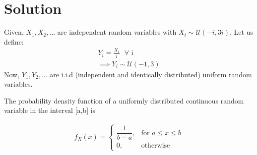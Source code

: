 \documentclass[journal,12pt,twocolumn]{IEEEtran}
\begin{document}
\section*{Solution}
Given, $X_1,X_2,\dots$ are independent random variables with $X_i\sim \mathcal U(-i,3i)$. Let us define:
\begin{align}
    Y_i = \frac{X_i}{i}\text{ }\forall\text{ i} \\
    \implies Y_i \sim \mathcal U(-1,3)
\end{align}
Now, $Y_1,Y_2,\dots$ are i.i.d (independent and identically distributed) uniform random variables.
\begin{definition}
The probability density function of a uniformly distributed continuous random variable in the interval [a,b] is 

\begin{align}
  f_X(x) = 
  \begin{cases}
      \dfrac{1}{b-a}, & \text{for } a\leq x \leq b\\
    0, & \text{otherwise } 
  \end{cases}
\end{align}

\end{definition}
\end{document}
